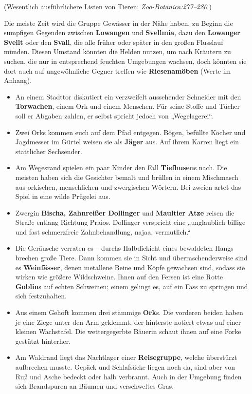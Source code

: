 (Wesentlich ausführlichere Listen von Tieren: \emph{Zoo-Botanica:277--280}.)

Die meiste Zeit wird die Gruppe Gewässer in der Nähe haben, zu Beginn die sumpfigen Gegenden zwischen \textbf{Lowangen} und \textbf{Svellmia},
dazu den \textbf{Lowanger Svellt} oder den \textbf{Svall}, die alle früher oder später in den großen Flusslauf münden.
Diesen Umstand könnten die Helden nutzen, um nach Kräutern zu suchen, die nur in entsprechend feuchten Umgebungen wachsen, doch könnten sie dort auch auf ungewöhnliche Gegner treffen wie \textbf{Riesenamöben} (Werte im Anhang).

\begin{itemize}
\item An einem Stadttor diskutiert ein verzweifelt aussehender Schneider mit den \textbf{Torwachen}, einem Ork und einem Menschen. Für seine Stoffe und Tücher soll er Abgaben zahlen, er selbst spricht jedoch von „Wegelagerei“.

\item Zwei Orks kommen euch auf dem Pfad entgegen. Bögen, befüllte Köcher und Jagdmesser im Gürtel weisen sie als \textbf{Jäger} aus. Auf ihrem Karren liegt ein stattlicher Sechsender.

\item Am Wegesrand spielen ein paar Kinder den Fall \textbf{Tiefhusen}s nach. Die meisten haben sich die Gesichter bemalt und brüllen in einem Mischmasch aus orkischen, menschlichen und zwergischen Wörtern. Bei zweien artet das Spiel in eine wilde Prügelei aus.

\item Zwergin \textbf{Bischa, Zahnreißer Dollinger} und \textbf{Maultier Atze} reisen die Straße entlang Richtung Praios. Dollinger verspricht eine „unglaublich billige und fast schmerzfreie Zahnbehandlung, najaa, vermutlich.“

\item Die Geräusche verraten es -- durchs Halbdickicht eines bewaldeten Hangs brechen große Tiere.
Dann kommen sie in Sicht und überraschenderweise sind es \textbf{Weinfässer}, denen metallene Beine und Köpfe gewachsen sind, sodass sie wirken wie größere Wildschweine.
Ihnen auf den Fersen ist eine Rotte \textbf{Goblin}s auf echten Schweinen; einem gelingt es, auf ein Fass zu springen und sich festzuhalten.

\item Aus einem Gehöft kommen drei stämmige \textbf{Ork}s.
Die vorderen beiden haben je eine Ziege unter den Arm geklemmt, der hinterste notiert etwas auf einer kleinen Wachstafel.
Die wettergegerbte Bäuerin schaut ihnen auf eine Forke gestützt hinterher.

\item Am Waldrand liegt das Nachtlager einer \textbf{Reisegruppe}, welche überstürzt aufbrechen musste.
Gepäck und Schlafsäcke liegen noch da, sind aber von Ruß und Asche bedeckt oder halb verbrannt.
Auch in der Umgebung finden sich Brandspuren an Bäumen und verschweltes Gras. 
\end{itemize}

